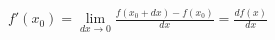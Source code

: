 \documentclass[preview]{standalone}
\begin{document}
\begin{align*}
f'(x_0)=\lim_{dx \to 0}\frac{f(x_0+dx)-f(x_0)}{dx}=\frac{df(x)}{dx}
\end{align*}
\end{document}
